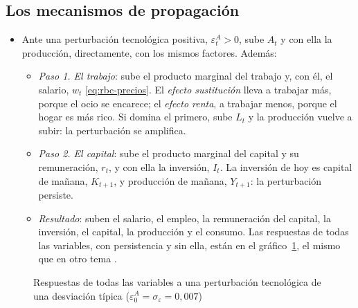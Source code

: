 \documentclass[11pt]{article}
\begin{document}
\subsection{Los mecanismos de propagación}

\begin{itemize}
\item Ante una perturbación tecnológica positiva, $\varepsilon^A_t>0$, sube $A_t$ y con ella la producción, directamente, con los mismos factores. Además:
  \begin{itemize}
  \item \emph{Paso 1. El trabajo}: sube el producto marginal del trabajo y, con él, el salario, $w_t$ \eqref{eq:rbc-precios}. El \emph{efecto sustitución} lleva a trabajar más, porque el ocio se encarece; el \emph{efecto renta}, a trabajar menos, porque el hogar es más rico. Si domina el primero, sube $L_t$ y la producción vuelve a subir: la perturbación se amplifica.
  \item \emph{Paso 2. El capital}: sube el producto marginal del capital y su remuneración, $r_t$, y con ella la inversión, $I_t$. La inversión de hoy es capital de mañana, $K_{t+1}$, y producción de mañana, $Y_{t+1}$: la perturbación persiste.
  \item \emph{Resultado}: suben el salario, el empleo, la remuneración del capital, la inversión, el capital, la producción y el consumo. Las respuestas de todas las variables, con persistencia y sin ella, están en el gráfico~\ref{fig:irf-rbc-completo}, el mismo que en otro tema .
  \end{itemize}
\end{itemize}

\begin{figure}[H]
\centering
\caption{Respuestas de todas las variables a una perturbación tecnológica de una desviación típica ($\varepsilon^A_0=\sigma_\varepsilon=0{,}007$)}\label{fig:irf-rbc-completo}
\end{figure}
\end{document}
